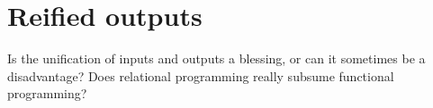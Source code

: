 \section{Reified outputs}\label{reif}
Is the unification of inputs and outputs a blessing, or can it sometimes be a disadvantage? Does relational programming really subsume functional programming?